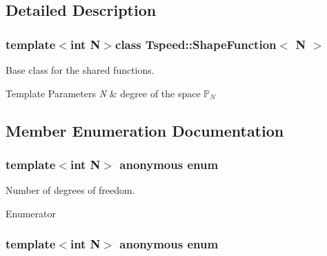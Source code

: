\subsection{Detailed Description}
\subsubsection*{template$<$int N$>$class Tspeed\-::\-Shape\-Function$<$ N $>$}

Base class for the shared functions. 


\begin{DoxyTemplParams}{Template Parameters}
{\em N} & degree of the space $\mathbb{P}_N$ \\
\hline
\end{DoxyTemplParams}


\subsection{Member Enumeration Documentation}
\hypertarget{classTspeed_1_1ShapeFunction_aae4b82bb304115736483f3549b135662}{\subsubsection[{anonymous enum}]{\setlength{\rightskip}{0pt plus 5cm}template$<$int N$>$ anonymous enum}}\label{classTspeed_1_1ShapeFunction_aae4b82bb304115736483f3549b135662}


Number of degrees of freedom. 

\begin{Desc}
\item[Enumerator]\par
\begin{description}
\item[{\em 
\hypertarget{classTspeed_1_1ShapeFunction_aae4b82bb304115736483f3549b135662a5000f7869288e4deef5af90732ca04fc}{gdl}\label{classTspeed_1_1ShapeFunction_aae4b82bb304115736483f3549b135662a5000f7869288e4deef5af90732ca04fc}
}]\end{description}
\end{Desc}
\hypertarget{classTspeed_1_1ShapeFunction_ab93d04cd0692e117dffed761620d57c1}{\subsubsection[{anonymous enum}]{\setlength{\rightskip}{0pt plus 5cm}template$<$int N$>$ anonymous enum}}\label{classTspeed_1_1ShapeFunction_ab93d04cd0692e117dffed761620d57c1}



